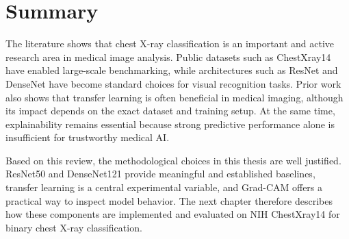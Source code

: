\section{Summary}
The literature shows that chest X-ray classification is an important and active research area in medical image analysis. Public datasets such as ChestXray14 have enabled large-scale benchmarking, while architectures such as ResNet and DenseNet have become standard choices for visual recognition tasks. Prior work also shows that transfer learning is often beneficial in medical imaging, although its impact depends on the exact dataset and training setup. At the same time, explainability remains essential because strong predictive performance alone is insufficient for trustworthy medical AI.

Based on this review, the methodological choices in this thesis are well justified. ResNet50 and DenseNet121 provide meaningful and established baselines, transfer learning is a central experimental variable, and Grad-CAM offers a practical way to inspect model behavior. The next chapter therefore describes how these components are implemented and evaluated on NIH ChestXray14 for binary chest X-ray classification.
